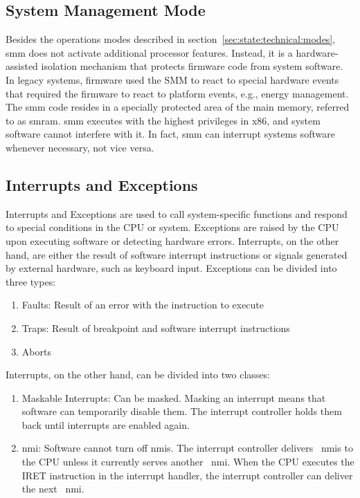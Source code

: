\subsection{System Management Mode}
\label{sec:state:technical:smm}
Besides the operations modes described in
section~\ref{sec:state:technical:modes}, \gls{smm} does not activate additional
processor features. Instead, it is a hardware-assisted isolation
mechanism that protects firmware code from system software. In legacy systems,
firmware used the SMM to react to special hardware events that required the
firmware to react to platform events, e.g., energy management. The \gls{smm} code
resides in a specially protected area of the main memory, referred to as
\gls{smram}. \gls{smm} executes with the highest privileges in x86, and system
software cannot interfere with it. In fact, \gls{smm} can interrupt
systems software whenever necessary, not vice versa.

\subsection{Interrupts and Exceptions}
\label{sec:state:technical:interrupts}
Interrupts and Exceptions are used to call system-specific functions and respond
to special conditions in the CPU or system. Exceptions are raised by the CPU
upon executing software or detecting hardware errors. Interrupts, on the other
hand, are either the result of software interrupt instructions or signals
generated by external hardware, such as keyboard input. Exceptions can be
divided into three types:
\begin{enumerate}
    \item Faults: Result of an error with the instruction to execute
    \item Traps: Result of breakpoint and software interrupt instructions
    \item Aborts
\end{enumerate}
Interrupts, on the other hand, can be divided into two classes:
\begin{enumerate}
    \item Maskable Interrupts: Can be masked. Masking an interrupt means that
          software can temporarily disable them. The interrupt controller holds
          them back until interrupts are enabled again.
    \item \Gls{nmi}: Software cannot turn off
          \glspl{nmi}. The interrupt controller delivers~
          \glspl{nmi} to the CPU unless it currently serves another~
          \gls{nmi}. When the CPU executes the IRET instruction in the
          interrupt handler, the interrupt controller can deliver the next~
          \gls{nmi}.
\end{enumerate}

